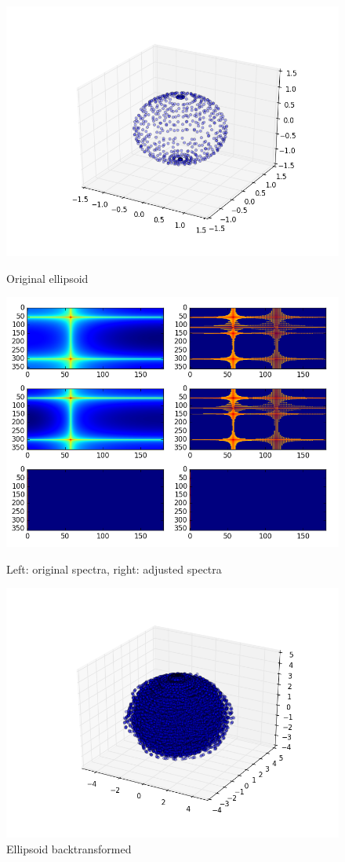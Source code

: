 \begin{figure}[!htb]
  \includegraphics[width=\linewidth]{images/original_ellipsoid.png}
  \caption{Original ellipsoid}
\endminipage\hfill
{}
  \includegraphics[width=\linewidth]{images/spectra_adjusted2.png}
  \caption{Left: original spectra, right: adjusted spectra}
\endminipage\hfill
{}%
  \includegraphics[width=\linewidth]{images/ellipsoid_backtransformed3.png}
  \caption{Ellipsoid backtransformed}
\endminipage
\end{figure}